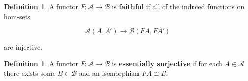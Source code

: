 \documentclass[11pt]{amsart}
\theoremstyle{plain}
\theoremstyle{definition}
\newtheorem{defn}[thm]{Definition}
\newcommand{\cA}{{\mathcal A}}
\newcommand{\cB}{{\mathcal B}}
\newcommand{\noi}{{\noindent}}
\begin{document}
\begin{defn}
A functor $F : \cA \to \cB$ is \textbf{faithful} if all of the induced functions on hom-sets 

  \[ \cA(A, A') \to \cB(FA, FA')\]
  
\noi are injective. 
\end{defn}

\begin{defn}
A functor $F : \cA \to \cB$ is \textbf{essentially surjective} if for each $A \in \cA$ there exists some $B \in \cB$ and an isomorphism $FA \cong B$. 
\end{defn}
\end{document}
